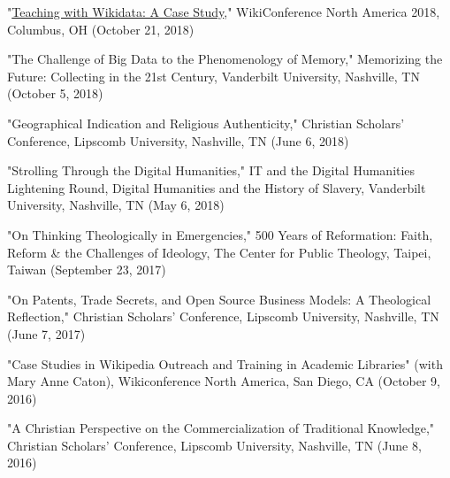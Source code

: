 \documentclass[10pt]{res} %
\begin{document}
\begin{resume}
\begin{hangparas}{.25in}{1}"\href{https://commons.wikimedia.org/wiki/File:Teaching_with_Wikidata-A_Case_Study.pdf}{Teaching with Wikidata: A Case Study}," WikiConference North America 2018, Columbus, OH (October 21, 2018)\end{hangparas}

\begin{hangparas}{.25in}{1}"The Challenge of Big Data to the Phenomenology of Memory," Memorizing the Future: Collecting in the 21st Century, Vanderbilt University, Nashville, TN (October 5, 2018)\end{hangparas}

\begin{hangparas}{.25in}{1}"Geographical Indication and Religious Authenticity," Christian Scholars’ Conference, Lipscomb University, Nashville, TN (June 6, 2018)\end{hangparas}

\begin{hangparas}{.25in}{1}"Strolling Through the Digital Humanities," IT and the Digital Humanities Lightening Round, Digital Humanities and the History of Slavery, Vanderbilt University, Nashville, TN (May 6, 2018)\end{hangparas}

\begin{hangparas}{.25in}{1}"On Thinking Theologically in Emergencies," 500 Years of Reformation: Faith, Reform \& the Challenges of Ideology, The Center for Public Theology, Taipei, Taiwan (September 23, 2017)\end{hangparas}

\begin{hangparas}{.25in}{1}"On Patents, Trade Secrets, and Open Source Business Models: A Theological Reflection," Christian Scholars’ Conference, Lipscomb University, Nashville, TN (June 7, 2017)\end{hangparas}

\begin{hangparas}{.25in}{1}"Case Studies in Wikipedia Outreach and Training in Academic Libraries" (with Mary Anne Caton), Wikiconference North America, San Diego, CA (October 9, 2016)\end{hangparas}

\begin{hangparas}{.25in}{1}"A Christian Perspective on the Commercialization of Traditional Knowledge," Christian Scholars’ Conference, Lipscomb University, Nashville, TN (June 8, 2016)\end{hangparas}


\end{resume}
\end{document}
